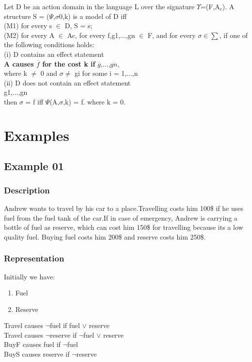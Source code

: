 \documentclass[11pt]{article}
\begin{document}
Let D be an action domain in the language L over the signature $\Upsilon$=(F,A$_{c}$). A structure S = ($\Psi$,$\sigma$0,k) is a model of D iff\\
(M1) for every s $\in$ D, S \textbar= s;\\
(M2) for every A $\in$ Ac, for every f,g1,...,gn $\in$ F, and for every $\sigma\in\sum$, if one of the following conditions holds:
\\\indent
(i) D contains an effect statement\\
\indent\indent 
{\bfseries A causes $\overline{f}$ for the cost k if} $\overline{g}$,...,$\overline{gn}$,\\
\indent where k $\neq$ 0 and $\sigma$\textbar$\neq$  gi for some i = 1,...,n\\
\indent(ii) D does not contain an effect statement\\
\indent{} g1,...,gn\\
\indent then $\sigma$ \textbar= f iff $\Psi$(A,$\sigma$,k) \textbar= f. where k = 0.\\

	\section{Examples}\label{sec:Examples}
	\subsection{Example 01}\label{example:ex01}
	\subsubsection{Description}\label{par:p101}
	Andrew wants to travel by his car to a place.Travelling costs him 100\$ if he uses fuel from the fuel tank of the car.If in case of emergency, Andrew is carrying a bottle of fuel as reserve, which can cost him 150\$ for travelling because its a low quality fuel. Buying fuel costs him 200\$ and reserve costs him 250\$.\\
	\subsubsection{Representation}\label{par:p201}
	Initially we have:
	\begin{enumerate}
		\item Fuel
		\item Reserve
	\end{enumerate}
	Travel causes $\neg$fuel if fuel $\vee$ reserve\\
	Travel causes $\neg$reserve if $\neg$fuel $\vee$ reserve\\
	BuyF causes fuel if $\neg$fuel\\ 
	BuyS causes reserve if $\neg$reserve\\
\end{document}
